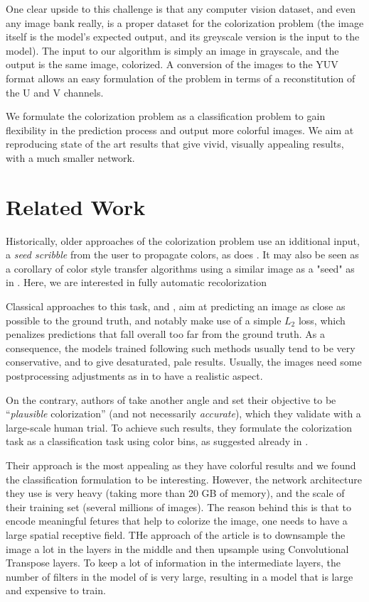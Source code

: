\documentclass[10pt,twocolumn,letterpaper]{article}
\begin{document}
One clear upside to this challenge is that any computer vision dataset, and even any image bank really, is a proper dataset for the colorization problem (the image itself is the model's expected output, and its greyscale version is the input to the model).
The input to our algorithm is simply an image in grayscale, and the output is the same image, colorized. A conversion of the images to the YUV format allows an easy formulation of the problem in terms of a reconstitution of the U and V channels. 

We formulate the colorization problem as a classification problem to gain flexibility in the prediction process and output more colorful images. We aim at reproducing state of the art results that give vivid, visually appealing results, with a much smaller network.  

\section{Related Work} \label{relatedwork}

Historically, older approaches of the colorization problem use an idditional input, a \textit{seed scribble} from the user to propagate colors, as does \cite{levin2004colorization}. It may also be seen as a corollary of color style transfer algorithms using a similar image as a "seed" as in \cite{he2017neuralct}. Here, we are interested in fully automatic recolorization

Classical approaches to this task, \eg \cite{cheng2015deep} and \cite{dahl2016tinyclouds}, aim at predicting an image as close as possible to the ground truth, and notably make use of a simple $L_2$ loss, which penalizes predictions that fall overall too far from the ground truth. As a consequence, the models trained following such methods usually tend to be very conservative, and to give desaturated, pale results. Usually, the images need some postprocessing adjustments as in \cite{deshpande2015learning} to have a realistic aspect.

On the contrary, authors of \cite{zhang2016colorful} take another angle and set their objective to be ``\textit{plausible} colorization'' (and not necessarily \textit{accurate}), which they validate with a large-scale human trial. To achieve such results, they formulate the colorization task as a classification task using color bins, as suggested already in \cite{charpiat2008automatic}. 

Their approach is the most appealing as they have colorful results and we found the classification formulation to be interesting. However, the network architecture they use is very heavy (taking more than 20 GB of memory), and the scale of their training set (several millions of images). The reason behind this is that to encode meaningful fetures that help to colorize the image, one needs to have a large spatial receptive field. THe approach of the article is to downsample the image a lot in the layers in the middle and then upsample using Convolutional Transpose layers. To keep a lot of information in the intermediate layers, the number of filters in the model of \cite{zhang2016colorful} is very large, resulting in a model that is large and expensive to train.
\end{document}
